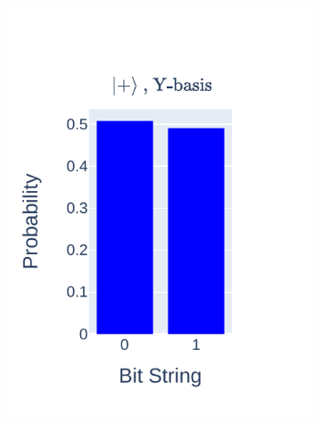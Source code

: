 \documentclass[journal]{IEEEtran}
\begin{document}
\begin{figure}
\begin{subfigure}{0.2\textwidth}
        \includegraphics[scale=0.8, trim={35 20 10 25}, clip]{figures/state_teleport/plus_y_results.pdf}
    \end{subfigure}
    \begin{subfigure}{0.2\textwidth}
        \centering

\end{subfigure}
\end{figure}
\end{document}
